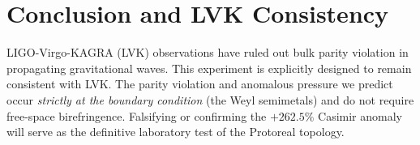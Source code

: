 \documentclass[12pt,oneside]{article}
\theoremstyle{principia}
\theoremstyle{definition}
\theoremstyle{remark}
\begin{document}
\section{Conclusion and LVK Consistency}\label{sec:conclusion}
LIGO-Virgo-KAGRA (LVK) observations have ruled out bulk parity violation in propagating gravitational waves. This experiment is explicitly designed to remain consistent with LVK. The parity violation and anomalous pressure we predict occur \emph{strictly at the boundary condition} (the Weyl semimetals) and do not require free-space birefringence. Falsifying or confirming the $+262.5\%$ Casimir anomaly will serve as the definitive laboratory test of the Protoreal topology.




\end{document}

